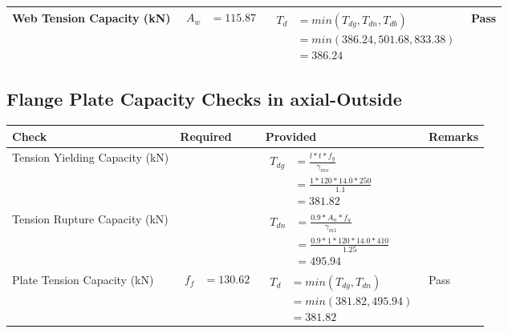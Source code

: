 \documentclass{article}%
\begin{document}
\begin{longtable}{|p{4cm}|p{6cm}|p{5.5cm}|p{1.5cm}|}
\hline%
Web Tension Capacity (kN)&$\begin{aligned} A_w &=115.87\end{aligned}$&$\begin{aligned} T_d &= min(T_{dg},T_{dn},T_{db})\\ &= min(386.24,501.68,833.38)\\ &=386.24\end{aligned}$&Pass\\%
\hline%
\end{longtable}

%
\newpage%
\subsection{Flange Plate Capacity Checks in axial{-}Outside }%
\label{subsec:FlangePlateCapacityChecksinaxial{-}Outside}%
\renewcommand{\arraystretch}{1.2}%
\begin{longtable}{|p{4cm}|p{6cm}|p{5.5cm}|p{1.5cm}|}%
\hline%
\rowcolor{OsdagGreen}%
Check&Required&Provided&Remarks\\%
\hline%
\endhead%
\hline%
Tension Yielding Capacity (kN)&&$\begin{aligned} T_{dg} &= \frac{l*t*f_y}{\gamma_{mo}}\\ &=\frac{1*120*14.0*250}{1.1}\\ &=381.82\end{aligned}$&\\%
\hline%
Tension Rupture Capacity (kN)&&$\begin{aligned} T_{dn} &= \frac{0.9*A_{n}*f_u}{\gamma_{m1}}\\ &=\frac{0.9*1*120*14.0*410}{1.25}\\ &=495.94\end{aligned}$&\\%
\hline%
Plate Tension Capacity (kN)&$\begin{aligned} f_f &=130.62\end{aligned}$&$\begin{aligned} T_d &= min(T_{dg},T_{dn})\\ &= min(381.82,495.94)\\ &=381.82\end{aligned}$&Pass\\%
\hline%
\end{longtable}

%
\newpage%
\end{document}

